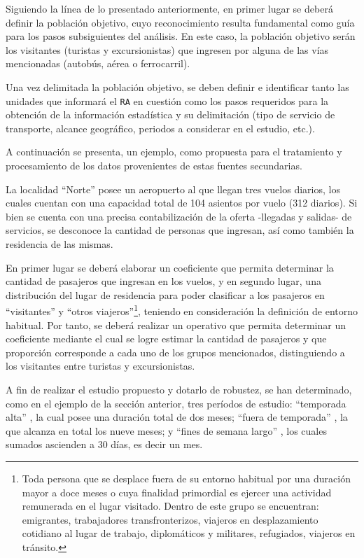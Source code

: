 \documentclass[
]{book}
\begin{document}
Siguiendo la línea de lo presentado anteriormente, en primer lugar se deberá definir la población objetivo, cuyo reconocimiento resulta fundamental como guía para los pasos subsiguientes del análisis. En este caso, la población objetivo serán los visitantes (turistas y excursionistas) que ingresen por alguna de las vías mencionadas (autobús, aérea o ferrocarril).

Una vez delimitada la población objetivo, se deben definir e identificar tanto las unidades que informará el \texttt{RA} en cuestión como los pasos requeridos para la obtención de la información estadística y su delimitación (tipo de servicio de transporte, alcance geográfico, periodos a considerar en el estudio, etc.).

A continuación se presenta, un ejemplo, como propuesta para el tratamiento y procesamiento de los datos provenientes de estas fuentes secundarias.

La localidad ``Norte'' posee un aeropuerto al que llegan tres vuelos diarios, los cuales cuentan con una capacidad total de 104 asientos por vuelo (312 diarios). Si bien se cuenta con una precisa contabilización de la oferta -llegadas y salidas- de servicios, se desconoce la cantidad de personas que ingresan, así como también la residencia de las mismas.

En primer lugar se deberá elaborar un coeficiente que permita determinar la cantidad de pasajeros que ingresan en los vuelos, y en segundo lugar, una distribución del lugar de residencia para poder clasificar a los pasajeros en ``visitantes'' y ``otros viajeros''\footnote{Toda persona que se desplace fuera de su entorno habitual por una duración mayor a doce meses o cuya finalidad primordial es ejercer una actividad remunerada en el lugar visitado. Dentro de este grupo se encuentran: emigrantes, trabajadores transfronterizos, viajeros en desplazamiento cotidiano al lugar de trabajo, diplomáticos y militares, refugiados, viajeros en tránsito.}, teniendo en consideración la definición de entorno habitual. Por tanto, se deberá realizar un operativo que permita determinar un coeficiente mediante el cual se logre estimar la cantidad de pasajeros y que proporción corresponde a cada uno de los grupos mencionados, distinguiendo a los visitantes entre turistas y excursionistas.

A fin de realizar el estudio propuesto y dotarlo de robustez, se han determinado, como en el ejemplo de la sección anterior, tres períodos de estudio: ``temporada alta'' , la cual posee una duración total de dos meses; ``fuera de temporada'' , la que alcanza en total los nueve meses; y ``fines de semana largo'' , los cuales sumados ascienden a 30 días, es decir un mes.
\end{document}
